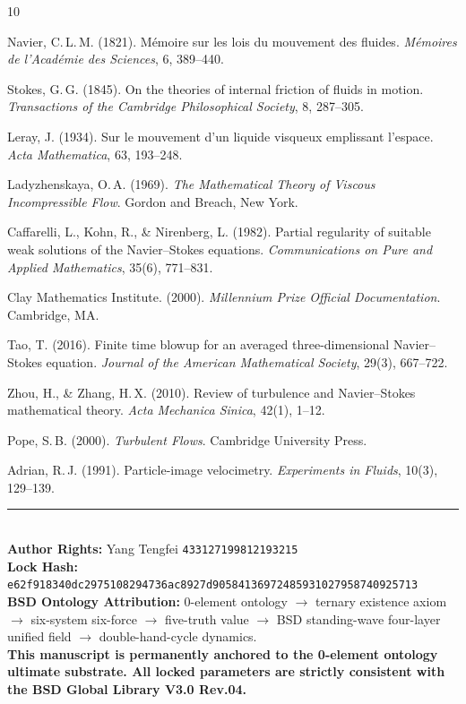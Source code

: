 \documentclass[11pt,a4paper]{article}
\theoremstyle{remark}
\begin{document}
\begin{thebibliography}{10}

Navier, C.\,L.\,M. (1821). M\'emoire sur les lois du mouvement des fluides.
\textit{M\'emoires de l'Acad\'emie des Sciences}, 6, 389--440.

Stokes, G.\,G. (1845). On the theories of internal friction of fluids in motion.
\textit{Transactions of the Cambridge Philosophical Society}, 8, 287--305.

Leray, J. (1934). Sur le mouvement d'un liquide visqueux emplissant l'espace.
\textit{Acta Mathematica}, 63, 193--248.

Ladyzhenskaya, O.\,A. (1969). \textit{The Mathematical Theory of Viscous Incompressible Flow}.
Gordon and Breach, New York.

Caffarelli, L., Kohn, R., \& Nirenberg, L. (1982). Partial regularity of suitable weak solutions of the Navier--Stokes equations.
\textit{Communications on Pure and Applied Mathematics}, 35(6), 771--831.

Clay Mathematics Institute. (2000). \textit{Millennium Prize Official Documentation}. Cambridge, MA.

Tao, T. (2016). Finite time blowup for an averaged three-dimensional Navier--Stokes equation.
\textit{Journal of the American Mathematical Society}, 29(3), 667--722.

Zhou, H., \& Zhang, H.\,X. (2010). Review of turbulence and Navier--Stokes mathematical theory.
\textit{Acta Mechanica Sinica}, 42(1), 1--12.

Pope, S.\,B. (2000). \textit{Turbulent Flows}. Cambridge University Press.

Adrian, R.\,J. (1991). Particle-image velocimetry.
\textit{Experiments in Fluids}, 10(3), 129--139.

\end{thebibliography}

\vspace{1em}
\noindent\rule{\textwidth}{0.4pt}\\
\textbf{Author Rights:} Yang Tengfei \quad \texttt{433127199812193215}\\
\textbf{Lock Hash:} \texttt{e62f918340dc2975108294736ac8927d90584136972485931027958740925713}\\
\textbf{BSD Ontology Attribution:} 0-element ontology $\to$ ternary existence axiom $\to$ six-system six-force $\to$ five-truth value $\to$ BSD standing-wave four-layer unified field $\to$ double-hand-cycle dynamics.\\
\textbf{This manuscript is permanently anchored to the 0-element ontology ultimate substrate. All locked parameters are strictly consistent with the BSD Global Library V3.0 Rev.04.}
\end{document}
